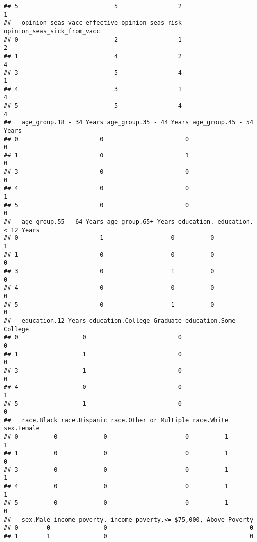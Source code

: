 \documentclass[
]{article}
\begin{document}
\begin{verbatim}
## 5                           5                 2                           1
##   opinion_seas_vacc_effective opinion_seas_risk opinion_seas_sick_from_vacc
## 0                           2                 1                           2
## 1                           4                 2                           4
## 3                           5                 4                           1
## 4                           3                 1                           4
## 5                           5                 4                           4
##   age_group.18 - 34 Years age_group.35 - 44 Years age_group.45 - 54 Years
## 0                       0                       0                       0
## 1                       0                       1                       0
## 3                       0                       0                       0
## 4                       0                       0                       1
## 5                       0                       0                       0
##   age_group.55 - 64 Years age_group.65+ Years education. education.< 12 Years
## 0                       1                   0          0                    1
## 1                       0                   0          0                    0
## 3                       0                   1          0                    0
## 4                       0                   0          0                    0
## 5                       0                   1          0                    0
##   education.12 Years education.College Graduate education.Some College
## 0                  0                          0                      0
## 1                  1                          0                      0
## 3                  1                          0                      0
## 4                  0                          0                      1
## 5                  1                          0                      0
##   race.Black race.Hispanic race.Other or Multiple race.White sex.Female
## 0          0             0                      0          1          1
## 1          0             0                      0          1          0
## 3          0             0                      0          1          1
## 4          0             0                      0          1          1
## 5          0             0                      0          1          0
##   sex.Male income_poverty. income_poverty.<= $75,000, Above Poverty
## 0        0               0                                        0
## 1        1               0                                        0

\end{verbatim}
\end{document}
